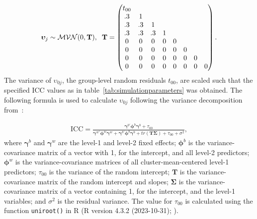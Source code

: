 \documentclass[10pt, a4paper, titlepage]{article}
\begin{document}
\begin{align}
    \boldsymbol{\upsilon}_{j} \sim \mathcal{MVN}(0, \mathbf{T}), \hspace{.2cm}
    \mathbf{T} = \begin{pmatrix}
        t_{00}& & & & & & \\
          .3& 1& & & & & \\
          .3& .3& 1& & & & \\
          .3& .3& .3& 1& & & \\
          0& 0& 0& 0& 0& & \\
          0& 0& 0& 0& 0& 0& \\
          0& 0& 0& 0& 0& 0& 0 \\
          0& 0& 0& 0& 0& 0& 0& 0
    \end{pmatrix} \label{eq:T}.
\end{align}
The variance of $\upsilon_{0j}$, the group-level random residuals $t_{00}$, are scaled such that the specified ICC values as in table~\ref{tab:simulationparameters} was obtained. The following formula is used to calculate $\upsilon_{0j}$ following the variance decomposition from~\cite{rights2019}:

\begin{align}
\label{eq:variancedecomposition}
\text{ICC} = \frac{\boldsymbol{\gamma}^{b'}\boldsymbol{\phi}^{b}\boldsymbol{\gamma}^{b} + \tau_{00}}{\boldsymbol{\gamma}^{w'}\boldsymbol{\phi}^{w}\boldsymbol{\gamma}^{w} + \boldsymbol{\gamma}^{b'}\boldsymbol{\phi}^{b}\boldsymbol{\gamma}^{b} + tr(\mathbf{T}\boldsymbol{\Sigma})+ \tau_{00} + \sigma^{2}},
\end{align} where $\boldsymbol{\gamma}^{b}$ and $\boldsymbol{\gamma}^{w}$ are the level-1 and level-2 fixed effects; $\boldsymbol{\phi}^{b}$ is the variance-covariance matrix of a vector with 1, for the intercept, and all level-2 predictors; $\boldsymbol{\phi}^{w}$ is the variance-covariance matrices of all cluster-mean-centered level-1 predictors; $\tau_{00}$ is the variance of the random intercept; $\mathbf{T}$ is the variance-covariance matrix of the random intercept and slopes; $\boldsymbol{\Sigma}$ is the variance-covariance matrix of a vector containing 1, for the intercept, and the level-1 variables; and $\sigma^{2}$ is the residual variance. The value for $\tau_{00}$ is calculated using the function \texttt{uniroot()} in R (R version 4.3.2 (2023-10-31); ).
\end{document}
